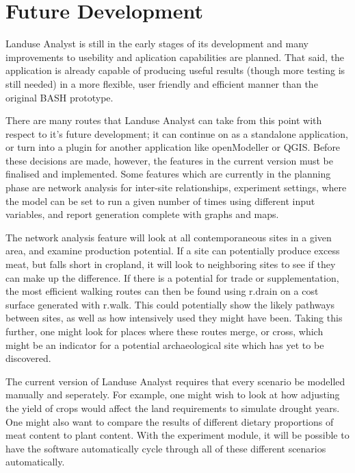 \section{Future Development} \label{FuturePlans} 

Landuse Analyst is still in the early stages of its development and many
improvements to usebility and aplication capabilities are planned. That said,
the application is already capable of producing useful results (though more
testing is still needed) in a more flexible, user friendly and efficient manner
than the original BASH prototype.

There are many routes that Landuse Analyst can take from this point with
respect to it's future development; it can continue on as a standalone
application, or turn into a plugin for another application like openModeller or
QGIS.  Before these decisions are made, however, the features in the current
version must be finalised and implemented.  Some features which are currently
in the planning phase are network analysis  for inter-site relationships,
experiment settings, where the model can be set to run a given number of times
using different input variables, and report generation complete with graphs and
maps. 

The network analysis feature will look at all contemporaneous sites in a given
area, and examine production potential.  If a site can potentially produce
excess meat, but falls short in cropland, it will look to neighboring sites to
see if they can make up the difference.  If there is a potential for trade or
supplementation, the most efficient walking routes can then be found using
r.drain on a cost surface generated with r.walk.  This could potentially show
the likely pathways between sites, as well as how intensively used they might
have been.  Taking this further, one might look for places where these routes
merge, or cross, which might be an indicator for a potential archaeological
site which has yet to be discovered.

The current version of Landuse Analyst requires that every scenario be modelled
manually and seperately.  For example, one might wish to look at how adjusting
the yield of crops would affect the land requirements to simulate drought
years.  One might also want to compare the results of different dietary
proportions of meat content to plant content.  With the experiment module, it
will be possible to have the software automatically cycle through all of these
different scenarios automatically.

